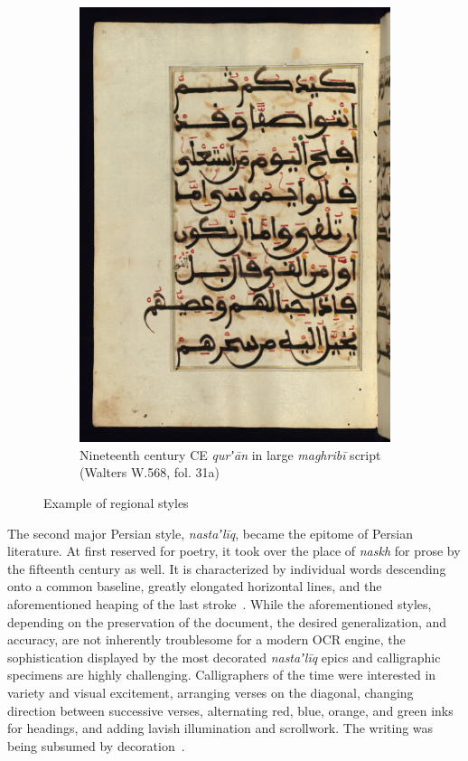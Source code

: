 \begin{figure}[h!tp]
\begin{subfigure}[t]{.48\textwidth}
                \includegraphics[height=0.4\textheight]{images/W568_000064_sap.jpg}
		\caption{Nineteenth century CE \emph{qurʼān} in large \emph{maghribī} script (Walters W.568, fol. 31a)}
                \label{fig:ara_maghribi}
        \end{subfigure}
        \caption{Example of regional styles}
\end{figure}


The second major Persian style, \emph{nastaʼlīq}, became the epitome of Persian
literature. At first reserved for poetry, it took over the place of
\emph{naskh} for prose by the fifteenth century as well. It is characterized by
individual words descending onto a common baseline, greatly elongated
horizontal lines, and the aforementioned heaping of the last stroke~\cite[pg.
166-167]{gacek2009arabic}. While the aforementioned styles, depending on the
preservation of the document, the desired generalization, and accuracy, are not
inherently troublesome for a modern OCR engine, the sophistication displayed by
the most decorated \emph{nastaʼlīq} epics and calligraphic specimens are highly
challenging. Calligraphers of the time were interested in variety and visual
excitement, arranging verses on the diagonal, changing direction between
successive verses, alternating red, blue, orange, and green inks for headings,
and adding lavish illumination and scrollwork. The writing was being subsumed
by decoration~\cite[pg. 436]{blair2006islamic}. 

